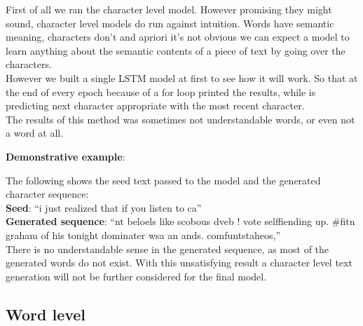 \documentclass[conference]{IEEEtran}
\begin{document}
First of all we ran the character level model. However promising they might sound, character level models do run against intuition. Words have semantic meaning, characters don't and apriori it's not obvious we can expect a model to learn anything about the semantic contents of a piece of text by going over the characters.\\
However we built a single LSTM model at first to see how it will work. So that at the end of every epoch because of a for loop printed the results, while is predicting next character appropriate with the most recent character.\\
The results of this method was sometimes not understandable words, or even not a word at all.

\textbf{Demonstrative example}:

The following shows the seed text passed to the model and the generated character sequence:\\

\textbf{Seed}: ``i just realized that if you listen to ca''\\

\textbf{Generated sequence}: ``nt beloels like scobous dveb ! vote selffiending up. \#fitn graham of his tonight dominater wsa an ands. comfuntstaheos,''\\

There is no understandable sense in the generated sequence, as most of the generated words do not exist. With this unsatisfying result a character level text generation will not be further considered for the final model.

\subsection{Word level}
\end{document}
